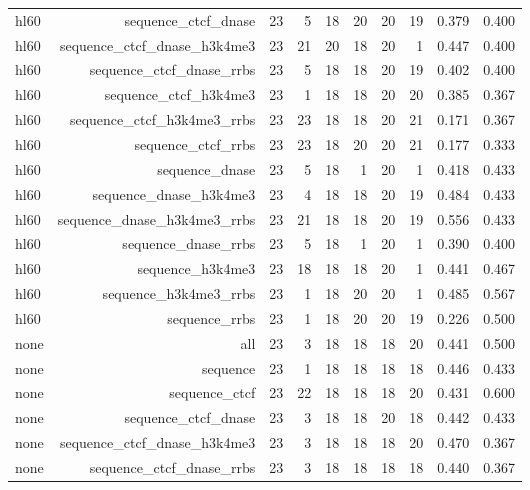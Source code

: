 \begin{table}[htbp]
{\begin{tabular}{lrrrrrrrrr}
hl60 & sequence\_ctcf\_dnase & 23 & 5 & 18 & 20 & 20 & 19 & 0.379 & 0.400 \\
hl60 & sequence\_ctcf\_dnase\_h3k4me3 & 23 & 21 & 20 & 18 & 20 & 1 & 0.447 & 0.400 \\
hl60 & sequence\_ctcf\_dnase\_rrbs & 23 & 5 & 18 & 18 & 20 & 19 & 0.402 & 0.400 \\
hl60 & sequence\_ctcf\_h3k4me3 & 23 & 1 & 18 & 18 & 20 & 20 & 0.385 & 0.367 \\
hl60 & sequence\_ctcf\_h3k4me3\_rrbs & 23 & 23 & 18 & 18 & 20 & 21 & 0.171 & 0.367 \\
hl60 & sequence\_ctcf\_rrbs & 23 & 23 & 18 & 20 & 20 & 21 & 0.177 & 0.333 \\
hl60 & sequence\_dnase & 23 & 5 & 18 & 1 & 20 & 1 & 0.418 & 0.433 \\
hl60 & sequence\_dnase\_h3k4me3 & 23 & 4 & 18 & 18 & 20 & 19 & 0.484 & 0.433 \\
hl60 & sequence\_dnase\_h3k4me3\_rrbs & 23 & 21 & 18 & 18 & 20 & 19 & 0.556 & 0.433 \\
hl60 & sequence\_dnase\_rrbs & 23 & 5 & 18 & 1 & 20 & 1 & 0.390 & 0.400 \\
hl60 & sequence\_h3k4me3 & 23 & 18 & 18 & 18 & 20 & 1 & 0.441 & 0.467 \\
hl60 & sequence\_h3k4me3\_rrbs & 23 & 1 & 18 & 20 & 20 & 1 & 0.485 & 0.567 \\
hl60 & sequence\_rrbs & 23 & 1 & 18 & 20 & 20 & 19 & 0.226 & 0.500 \\
none & all & 23 & 3 & 18 & 18 & 18 & 20 & 0.441 & 0.500 \\
none & sequence & 23 & 1 & 18 & 18 & 18 & 18 & 0.446 & 0.433 \\
none & sequence\_ctcf & 23 & 22 & 18 & 18 & 18 & 20 & 0.431 & 0.600 \\
none & sequence\_ctcf\_dnase & 23 & 3 & 18 & 18 & 20 & 18 & 0.442 & 0.433 \\
none & sequence\_ctcf\_dnase\_h3k4me3 & 23 & 3 & 18 & 18 & 18 & 20 & 0.470 & 0.367 \\
none & sequence\_ctcf\_dnase\_rrbs & 23 & 3 & 18 & 18 & 18 & 18 & 0.440 & 0.367 \\
\bottomrule
\end{tabular}
}
\end{table}

